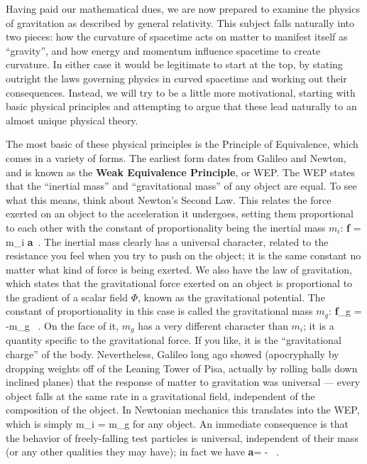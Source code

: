 \documentclass[12pt]{article}
\begin{document}
Having paid our mathematical dues, we are now prepared to examine
the physics of gravitation as described by general relativity.  This
subject falls naturally into two pieces:  how the curvature of
spacetime acts on matter to manifest itself as ``gravity'', and 
how energy and momentum influence spacetime to create curvature.
In either case it would be legitimate to start at the top, by stating
outright the laws governing physics in curved spacetime and working
out their consequences.  Instead, we will try to be a little more
motivational, starting with basic physical principles and attempting
to argue that these lead naturally to an almost unique physical 
theory.

The most basic of these physical principles is the Principle of
Equivalence, which comes in a variety of forms.  The earliest form
dates from Galileo and Newton, and is known as the {\bf Weak
Equivalence Principle}, or WEP.  The WEP states that the ``inertial
mass'' and ``gravitational mass'' of any object are equal.  To see
what this means, think about Newton's Second Law.  This relates
the force exerted on an object to the acceleration it undergoes,
setting them proportional to each other with the constant of 
proportionality being the inertial mass $m_i$:
\be
  {\bf f} = m_i {\bf a}\ .\label{4.1}
\ee
The inertial mass clearly has a universal character, related to the
resistance you feel when you try to push on the object; it is the
same constant no matter what kind of force is being exerted.  We also
have the law of gravitation, which states that the gravitational
force exerted on an object is proportional to the gradient of a scalar
field $\Phi$, known as the gravitational potential.  The constant of
proportionality in this case is called the gravitational mass $m_g$:
\be
  {\bf f}_g = -m_g \nabla\Phi\ .\label{4.2}
\ee
On the face of it, $m_g$ has a very different character than $m_i$;
it is a quantity specific to the gravitational force.  If you like, it
is the ``gravitational charge'' of the body.  Nevertheless, Galileo
long ago showed (apocryphally by dropping weights off of the Leaning
Tower of Pisa, actually by rolling balls down inclined planes) that
the response of matter to gravitation was universal --- every object
falls at the same rate in a gravitational field, independent of
the composition of the object.  In Newtonian mechanics this 
translates into the WEP, which is simply
\be
  m_i = m_g\label{4.3}
\ee
for any object.  An immediate consequence is that the behavior of
freely-falling test particles is universal, independent of their mass
(or any other qualities they may have); in fact we have
\be
  {\bf a}= - \nabla\Phi\ .\label{4.4}
\ee
\end{document}
